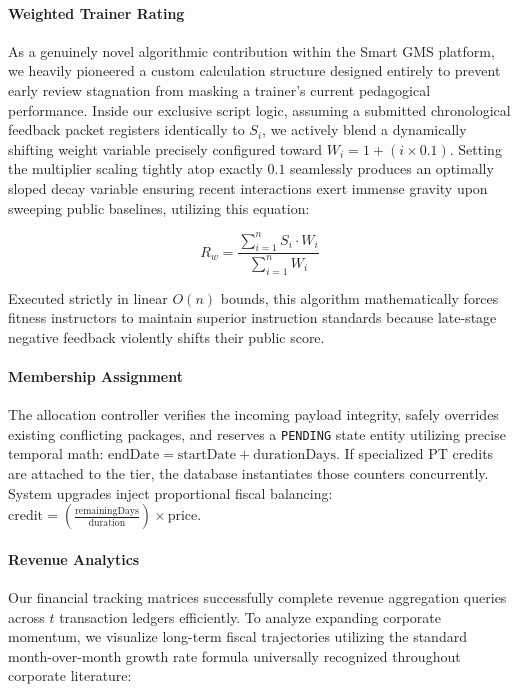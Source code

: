 \paragraph*{Weighted Trainer Rating}\label{weighted-trainer-rating}

As a genuinely novel algorithmic contribution within the Smart GMS
platform, we heavily pioneered a custom calculation structure designed
entirely to prevent early review stagnation from masking a trainer's
current pedagogical performance. Inside our exclusive script logic,
assuming a submitted chronological feedback packet registers identically
to \(S_i\), we actively blend a dynamically shifting weight variable
precisely configured toward \(W_i = 1 + (i \times 0.1)\). Setting the
multiplier scaling tightly atop exactly \(0.1\) seamlessly produces an
optimally sloped decay variable ensuring recent interactions exert
immense gravity upon sweeping public baselines, utilizing this equation:

\begin{equation}
R_w = \frac{\displaystyle\sum_{i=1}^{n} S_i \cdot W_i}{\displaystyle\sum_{i=1}^{n} W_i}
\end{equation}

Executed strictly in linear \(O(n)\) bounds, this algorithm
mathematically forces fitness instructors to maintain superior
instruction standards because late-stage negative feedback violently
shifts their public score.

\paragraph*{Membership Assignment}\label{membership-assignment}

The allocation controller verifies the incoming payload integrity,
safely overrides existing conflicting packages, and reserves a
\texttt{PENDING} state entity utilizing precise temporal math:
\(\text{endDate} = \text{startDate} + \text{durationDays}\). If
specialized PT credits are attached to the tier, the database
instantiates those counters concurrently. System upgrades inject
proportional fiscal balancing:
\(\text{credit} = \left(\frac{\text{remainingDays}}{\text{duration}}\right) \times \text{price}\).

\paragraph*{Revenue Analytics}\label{revenue-analytics}

Our financial tracking matrices successfully complete revenue
aggregation queries across \(t\) transaction ledgers efficiently. To
analyze expanding corporate momentum, we visualize long-term fiscal
trajectories utilizing the standard month-over-month growth rate formula
universally recognized throughout corporate literature:

